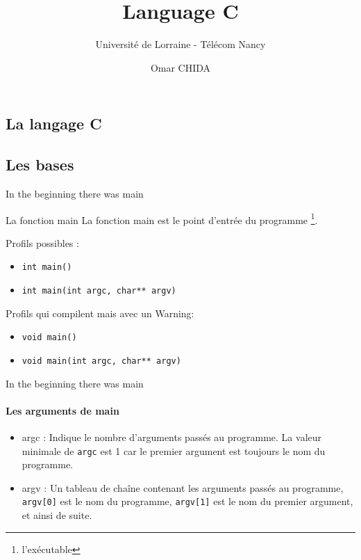 \documentclass{beamer}
\title{Language C}
\subtitle{Université de Lorraine - Télécom Nancy}
\author{Omar CHIDA}
\begin{document}
  \frame[c]{\maketitle}


  \begin{darkframes}
  	
	
	
  	\section{La langage C}
  	\subsection{Les bases}
  	\begin{frame}{In the beginning there was main}
  		\begin{block}{La fonction main}
  			La fonction \alert{main} est le point d'entrée du programme \footnote[frame]{l'exécutable}.
  		\end{block}
  		\begin{exampleblock}{Profils possibles :}
  			\begin{itemize}
  				\item \texttt{int main()}
  				\item \texttt{int main(int argc, char** argv)}
  			\end{itemize}
  		\end{exampleblock}
  		\begin{alertblock}{Profils qui compilent mais avec un Warning:}
  			\begin{itemize}
	  			\item \texttt{void main()}
	  			\item \texttt{void main(int argc, char** argv)}
  			\end{itemize}
  		\end{alertblock}
  	\end{frame}
  
  	\begin{frame}{In the beginning there was main}
		\framesubtitle{Les arguments de main}
		\begin{itemize}
			\item \alert{argc} : Indique le nombre d'arguments passés au programme. La valeur minimale de \texttt{argc} est 1 car le premier argument est toujours le nom du programme.
			\item \alert{argv} : Un tableau de chaîne contenant les arguments passés au programme, \texttt{argv[0]} est le nom du programme, \texttt{argv[1]} est le nom du premier argument, et ainsi de suite.
		\end{itemize}
  	\end{frame}
  

\end{darkframes}
\end{document}
